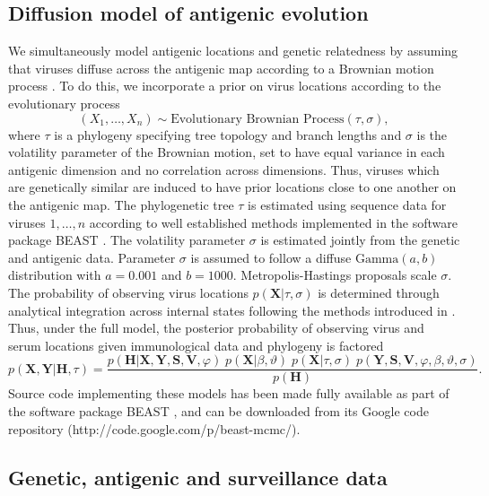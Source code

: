 \documentclass[11pt,oneside,letterpaper]{article}
\newcommand{\mdssd}{\varphi}						%
\newcommand{\diffusionsd}{\sigma}					%
\newcommand{\tree}{\tau}							%
\newcommand{\vn}{n}									%
\begin{document}
\subsection*{Diffusion model of antigenic evolution}

We simultaneously model antigenic locations and genetic relatedness by assuming that viruses diffuse across the antigenic map according to a Brownian motion process \cite{Lemey10}.
To do this, we incorporate a prior on virus locations according to the evolutionary process
\begin{equation}
	(X_1,\ldots,X_n) \sim \mbox{Evolutionary Brownian Process}(\tree, \diffusionsd),
\end{equation}
where $\tree$ is a phylogeny specifying tree topology and branch lengths and $\diffusionsd$ is the volatility parameter of the Brownian motion,  set to have equal variance in each antigenic dimension and no correlation across dimensions.
Thus, viruses which are genetically similar are induced to have prior locations close to one another on the antigenic map.
The phylogenetic tree $\tree$ is estimated using sequence data for viruses $1,\ldots,\vn$ according to well established methods implemented in the software package BEAST \cite{BEAST, BEAST17}.
The volatility parameter $\diffusionsd$ is estimated jointly from the genetic and antigenic data.
Parameter $\diffusionsd$ is assumed to follow a diffuse $\mbox{Gamma}(a, b)$ distribution with $a=0.001$ and $b=1000$.
Metropolis-Hastings proposals scale $\diffusionsd$.
The probability of observing virus locations $p(\mathbf{X}|\tree,\diffusionsd)$ is determined through analytical integration across internal states following the methods introduced in \cite{Lemey10}.
Thus, under the full model, the posterior probability of observing virus and serum locations given immunological data and phylogeny is factored
\begin{equation}
	p(\mathbf{X},\mathbf{Y} | \mathbf{H},\tree) = \frac{ p(\mathbf{H}|\mathbf{X},\mathbf{Y},\mathbf{S},\mathbf{V}, \mdssd) \; 
	p(\mathbf{X} | \beta, \vartheta) \;
	p(\mathbf{X} | \tree, \diffusionsd) \; 
	p(\mathbf{Y},\mathbf{S},\mathbf{V},\mdssd,\beta,\vartheta,\diffusionsd)}{ p(\mathbf{H}) }.
\end{equation}
Source code implementing these models has been made fully available as part of the software package BEAST \cite{BEAST, BEAST17}, and can be downloaded from its Google code repository (http://code.google.com/p/beast-mcmc/).

\subsection*{Genetic, antigenic and surveillance data}
\end{document}
